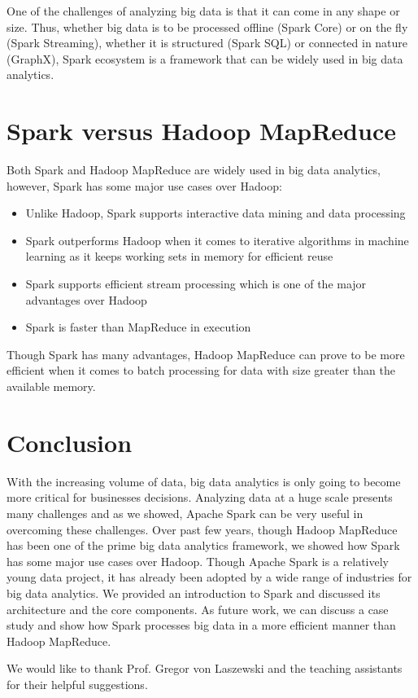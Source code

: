 \documentclass[sigconf]{acmart}
\begin{document}
One of the challenges of analyzing big data is that it can come in any shape or size. Thus, whether big data is to be processed offline (Spark Core) or on the fly (Spark Streaming), whether it is structured (Spark SQL) or connected in nature (GraphX), Spark ecosystem is a framework that can be widely used in big data analytics.

\section{Spark versus Hadoop MapReduce}
Both Spark and Hadoop MapReduce are widely used in big data analytics, however, Spark has some major use cases over Hadoop\cite{verma2016big_p3}:
\begin{itemize}
	\item Unlike Hadoop, Spark supports interactive data mining and data processing
  \item Spark outperforms Hadoop when it comes to iterative algorithms in machine learning as it keeps working sets in memory for efficient reuse  
  \item Spark supports efficient stream processing which is one of the major advantages over Hadoop
  \item Spark is faster than MapReduce in execution
\end{itemize}

Though Spark has many advantages, Hadoop MapReduce can prove to be more efficient when it comes to batch processing for data with size greater than the available memory.

\section{Conclusion}
With the increasing volume of data, big data analytics is only going to become more critical for businesses decisions. Analyzing data at a huge scale presents many challenges and as we showed, Apache Spark can be very useful in overcoming these challenges. Over past few years, though Hadoop MapReduce has been one of the prime big data analytics framework, we showed how Spark has some major use cases over Hadoop. Though Apache Spark is a relatively young data project, it has already been adopted by a wide range of industries for big data analytics. We provided an introduction to Spark and discussed its architecture and the core components. As future work, we can discuss a case study and show how Spark processes big data in a more efficient manner than Hadoop MapReduce.

\begin{acks}

  We would like to thank Prof. Gregor von Laszewski and the teaching assistants for their helpful suggestions. 

\end{acks}


 
\end{document}
